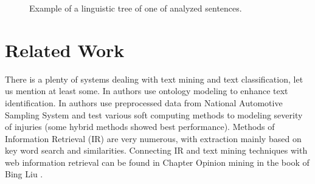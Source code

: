 \begin{multicols}{2}
\begin{figure}
\medskip
\centerline{}
\caption{Example of a linguistic tree of one of analyzed sentences.}
\label{dedek:tree}
\end{figure}



\section{Related Work} \label{dedek:related}

There is a plenty of systems dealing with text mining and text classification, let us mention at least some. In \cite{dedek:ReYaLiOntoText08} authors use ontology modeling to enhance text identification. In \cite{dedek:CAP} authors use preprocessed data from National Automotive Sampling System and test various soft computing methods to modeling severity of injuries (some hybrid methods showed best performance). Methods of Information Retrieval (IR) are very numerous, with extraction mainly based on key word search and similarities. Connecting IR and text mining techniques with web information retrieval can be found in Chapter Opinion mining in the book of Bing Liu \cite{dedek:WebDataMining}. 



\end{multicols}
